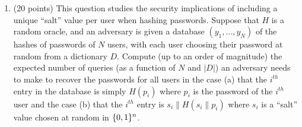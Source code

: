 \documentclass{article}
\begin{document}
\begin{enumerate}[noitemsep,topsep=\mdcompacttopsep,start=3]%

\item{}(20 points) This question studies the security implications of including a unique \textquotedblleft{}salt\textquotedblright{} value per user when hashing passwords.
Suppose that $H$ is a random oracle, and an adversary is given a database $(y_1,\ldots,y_N)$ of the hashes of passwords of $N$ users, with each user choosing their
password at random from a dictionary $D$. Compute (up to an order of magnitude)
the expected number of queries (as a function of $N$ and $|D|$)  an adversary needs to make to recover the passwords for all users in the case (a) that the $i^{th}$  entry in the database is simply $H(p_i)$ where $p_i$ is the password of the $i^{th}$ user and the case (b) that the $i^{th}$ entry is $s_i\|H(s_i\|p_i)$ where $s_i$ is a \textquotedblleft{}salt\textquotedblright{} value chosen at random in $\{0,1\}^n$.
 

\begin{enumerate}[noitemsep,topsep=\mdcompacttopsep,label=\alph*.]%


\end{enumerate}
\end{enumerate}
\end{document}
